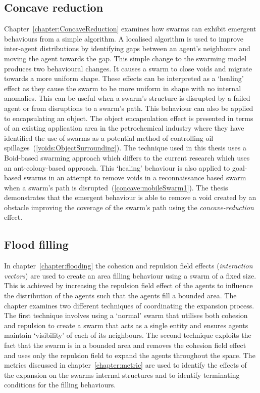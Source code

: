 \subsection{Concave reduction}
Chapter~\ref{chapter:ConcaveReduction} examines how swarms can exhibit emergent behaviours from a simple algorithm. A localised algorithm is used to improve inter-agent distributions by identifying gaps between an agent's neighbours and moving the agent towards the gap. This simple change to the swarming model produces two behavioural changes. It causes a swarm to close voids and migrate towards a more uniform shape. These effects can be interpreted as a `healing' effect as they cause the swarm to be more uniform in shape with no internal anomalies. This can be useful when a swarm's structure is disrupted by a failed agent or from disruptions to a swarm's path. This behaviour can also be applied to encapsulating an object. The object encapsulation effect is presented in terms of an existing application area in the petrochemical industry where they have identified the use of swarms as a potential method of controlling oil spillages~(\autoref{voids:ObjectSurrounding}). The technique used in this thesis uses a Boid-based swarming approach which differs to the current research which uses an ant-colony-based approach. This `healing' behaviour is also applied to goal-based swarms in an attempt to remove voids in a reconnaissance based swarm when a swarm's path is disrupted~(\autoref{concave:mobileSwarm1}). The thesis demonstrates that the emergent behaviour is able to remove a void created by an obstacle improving the coverage of the swarm's path using the \textit{concave-reduction} effect.

\subsection{Flood filling}
In chapter~\ref{chapter:flooding} the cohesion and repulsion field effects (\textit{interaction vectors}) are used to create an area filling behaviour using a swarm of a fixed size. This is achieved by increasing the repulsion field effect of the agents to influence the distribution of the agents such that the agents fill a bounded area. The chapter examines two different techniques of coordinating the expansion process. The first technique involves using a `normal' swarm that utilises both cohesion and repulsion to create a swarm that acts as a single entity and ensures agents maintain `visibility' of each of its neighbours. The second technique exploits the fact that the swarm is in a bounded area and removes the cohesion field effect and uses only the repulsion field to expand the agents throughout the space. The metrics discussed in chapter~\ref{chapter:metric} are used to identify the effects of the expansion on the swarms internal structures and to identify terminating conditions for the filling behaviours.

